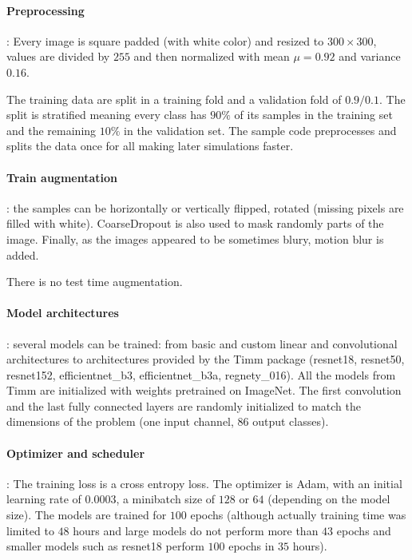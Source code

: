 \documentclass{article}
\begin{document}
\paragraph{Preprocessing}: Every image is square padded (with white color) and resized to $300 \times 300$, values are divided by $255$ and then normalized with mean $\mu=0.92$ and variance $0.16$.

The training data are split in a training fold and a validation fold of $0.9/0.1$. The split is stratified meaning every class has $90\%$ of its samples in the training set and the remaining $10\%$ in the validation set. The sample code preprocesses and splits the data once for all making later simulations faster.

\paragraph{Train augmentation}: the samples can be horizontally or vertically flipped, rotated (missing pixels are filled with white). CoarseDropout is also used to mask randomly parts of the image. Finally, as the images appeared to be sometimes blury, motion blur is added.


There is no test time augmentation.

\paragraph{Model architectures}: several models can be trained: from basic and custom linear and convolutional architectures to architectures provided by the Timm package (resnet18, resnet50, resnet152, efficientnet\_b3, efficientnet\_b3a, regnety\_016). All the models from Timm are initialized with weights pretrained on ImageNet. The first convolution and the last fully connected layers are randomly initialized to match the dimensions of the problem (one input channel, 86 output classes).


\paragraph{Optimizer and scheduler}: The training loss is a cross entropy loss. The optimizer is Adam, with an initial learning rate of $0.0003$, a minibatch size of $128$ or $64$ (depending on the model size). The models are trained for $100$ epochs (although actually training time was limited to $48$ hours and large models do not perform more than $43$ epochs and smaller models such as resnet18 perform $100$ epochs in $35$ hours). 
\end{document}
